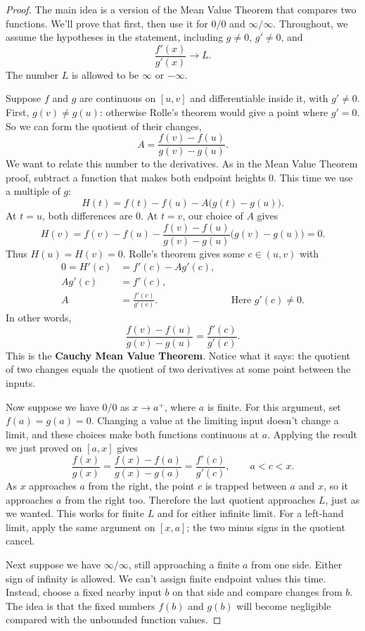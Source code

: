 \label{sec:lhopital-proof}

\begin{proof}
The main idea is a version of the Mean Value Theorem that compares two
functions. We'll prove that first, then use it for $0/0$ and
$\infty/\infty$. Throughout, we assume the hypotheses in the statement,
including $g\ne0$, $g'\ne0$, and
$$\frac{f'(x)}{g'(x)}\longrightarrow L.$$
The number $L$ is allowed to be $\infty$ or $-\infty$.

Suppose $f$ and $g$ are continuous on $[u,v]$ and differentiable inside
it, with $g'\ne0$. First, $g(v)\ne g(u)$: otherwise Rolle's theorem would
give a point where $g'=0$. So we can form the quotient of their changes,
$$A=\frac{f(v)-f(u)}{g(v)-g(u)}.$$
We want to relate this number to the derivatives. As in the Mean Value
Theorem proof, subtract a function that makes both endpoint heights 0.
This time we use a multiple of $g$:
$$H(t)=f(t)-f(u)-A\bigl(g(t)-g(u)\bigr).$$
At $t=u$, both differences are 0. At $t=v$, our choice of $A$ gives
$$H(v)=f(v)-f(u)-\frac{f(v)-f(u)}{g(v)-g(u)}
                     \bigl(g(v)-g(u)\bigr)=0.$$
Thus $H(u)=H(v)=0$. Rolle's theorem gives some $c\in(u,v)$ with
\begin{align*}
0=H'(c)&=f'(c)-Ag'(c),\\
Ag'(c)&=f'(c),\\
A&=\frac{f'(c)}{g'(c)}. &&\text{Here $g'(c)\ne0$.}
\end{align*}
In other words,
$$\frac{f(v)-f(u)}{g(v)-g(u)}=\frac{f'(c)}{g'(c)}.$$
This is the \textbf{Cauchy Mean Value Theorem}. Notice what it says:
the quotient of two changes equals the quotient of two derivatives at
some point between the inputs.

Now suppose we have $0/0$ as $x\to a^+$, where $a$ is finite. For this
argument, set $f(a)=g(a)=0$. Changing a value at the limiting input
doesn't change a limit, and these choices make both functions continuous
at $a$. Applying the result we just proved on $[a,x]$ gives
$$\frac{f(x)}{g(x)}
  =\frac{f(x)-f(a)}{g(x)-g(a)}
  =\frac{f'(c)}{g'(c)},\qquad a<c<x.$$
As $x$ approaches $a$ from the right, the point $c$ is trapped between
$a$ and $x$, so it approaches $a$ from the right too. Therefore the last
quotient approaches $L$, just as we wanted. This works for finite $L$
and for either infinite limit. For a left-hand limit, apply the same
argument on $[x,a]$; the two minus signs in the quotient cancel.

Next suppose we have $\infty/\infty$, still approaching a finite $a$
from one side. Either sign of infinity is allowed. We can't assign
finite endpoint values this time. Instead, choose a fixed nearby input
$b$ on that side and compare changes from $b$. The idea is that the
fixed numbers $f(b)$ and $g(b)$ will become negligible compared with
the unbounded function values.


\end{proof}
